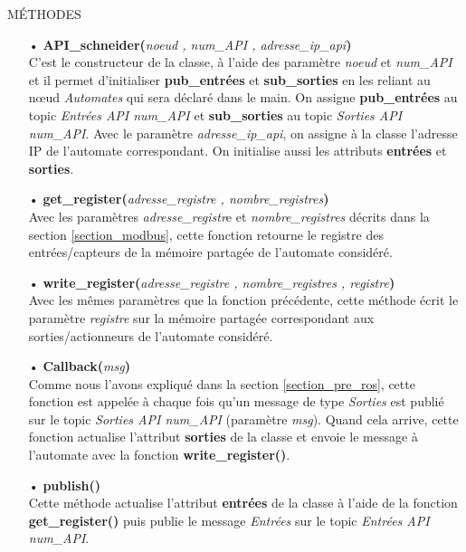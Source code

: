 \documentclass[a4paper,french, titlepage]{book}
\begin{document}
\begin{center}
MÉTHODES
\end{center}

\begin{itemize}
\item[•] \textbf{API\_schneider(}\emph{noeud , num\_API , adresse\_ip\_api}\textbf{)}\\
C'est le constructeur de la classe, à l'aide des paramètre \emph{noeud} et \emph{num\_API} et il permet d'initialiser \textbf{pub\_entrées} et \textbf{sub\_sorties} en les reliant au nœud \emph{Automates} qui sera déclaré dans le main. On assigne \textbf{pub\_entrées} au topic \emph{Entrées API num\_API} et \textbf{sub\_sorties} au topic \emph{Sorties API num\_API}. Avec le paramètre \emph{adresse\_ip\_api}, on assigne à la classe l'adresse IP de l'automate correspondant. On initialise aussi les attributs \textbf{entrées} et \textbf{sorties}.
\item[ ]
\item[•] \textbf{get\_register(}\emph{adresse\_registre , nombre\_registres}\textbf{)}\\
Avec les paramètres \emph{adresse\_registr}e et \emph{nombre\_registres} décrits dans la section \ref{section_modbus}, cette fonction retourne le registre des entrées/capteurs de la mémoire partagée de l'automate considéré.
\item[ ]
\item[•] \textbf{write\_register(}\emph{adresse\_registre , nombre\_registres , registre}\textbf{)}\\
Avec les mêmes paramètres que la fonction précédente, cette méthode écrit le paramètre \emph{registre} sur la mémoire partagée correspondant aux sorties/actionneurs de l'automate considéré.
\item[ ]
\item[•] \textbf{Callback(}\emph{msg}\textbf{)}\\
Comme nous l'avons expliqué dans la section \ref{section_pre_ros}, cette fonction est appelée à chaque fois qu'un message de type \emph{Sorties} est publié sur le topic \emph{Sorties API num\_API} (paramètre \emph{msg}). Quand cela arrive, cette fonction actualise l'attribut \textbf{sorties} de la classe et envoie le message à l'automate avec la fonction \textbf{write\_register()}.
\item[ ]
\item[•] \textbf{publish()}\\
Cette méthode actualise l'attribut \textbf{entrées} de la classe à l'aide de la fonction \textbf{get\_register()} puis publie le message \emph{Entrées} sur le topic \emph{Entrées API num\_API}.
\end{itemize}
\end{document}

